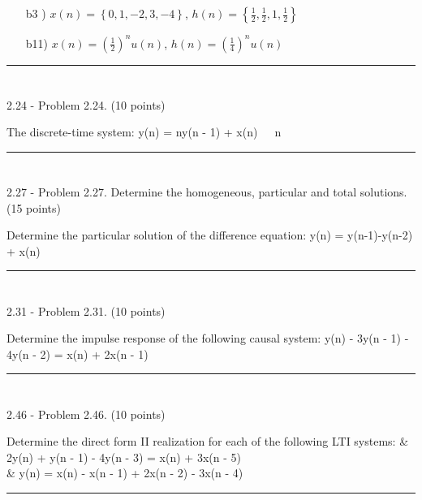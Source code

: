 \documentclass[a4paper, 11pt]{exam}
\begin{document}
\begin{enumerate}
  \item  [b3   )] $x(n) = \left\lbrace0, 1, -2, 3, -4\right\rbrace$, $ h(n) = \left\lbrace \frac{1}{2} , \frac{1}{2} , 1, \frac{1}{2} \right\rbrace$
  \item  [b11)] $x(n) =\left(\frac{1}{2}\right)^n u(n)$, $ h(n) =\left( \frac{1}{4}\right)^n u(n)$
\end{enumerate}
\hrule
\section{}
2.24 - Problem 2.24. (10 points)\\
\begin{eqnsection}{-2em}{The discrete-time system:}
  y(n) = ny(n - 1) + x(n)\text{,}\quad\ \ \ n 
\end{eqnsection}
\vspace{2em}
\hrule
\section{}
2.27 - Problem 2.27. Determine the homogeneous, particular and total solutions. (15 points)\\
\begin{eqnsection}{-3em}{Determine the particular solution of the difference equation:}
  y(n) = y(n-1)-y(n-2) + x(n)\\
\end{eqnsection}
\vspace{2em}
\hrule
\section{}
2.31 - Problem 2.31. (10 points)\\
\begin{eqnsection}{-3em}{Determine the impulse response of the following causal system:}
  y(n) - 3y(n - 1) - 4y(n - 2) = x(n) + 2x(n - 1)
\end{eqnsection}
\vspace{2em}
\hrule
\section{}
2.46 - Problem 2.46. (10 points)\\
\begin{eqnsection}{-3em}{Determine the direct form II realization for each of the following LTI systems:}
  & 2y(n) + y(n - 1) - 4y(n - 3) = x(n) + 3x(n - 5)\\
  & y(n) = x(n) - x(n - 1) + 2x(n - 2) - 3x(n - 4)
\end{eqnsection}
\vspace{2em}
\hrule
\end{document}

